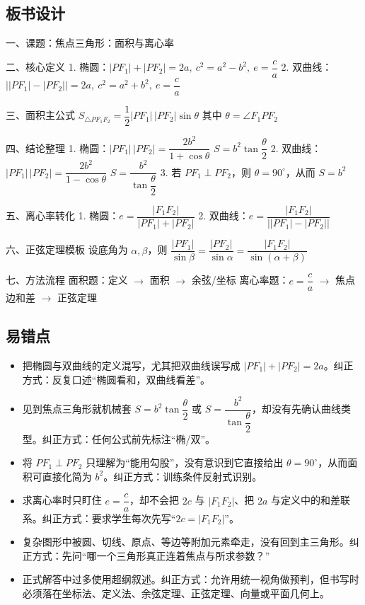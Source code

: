 \documentclass[UTF8,a4paper,11pt]{ctexart}
\begin{document}
\subsection*{板书设计}

一、课题：焦点三角形：面积与离心率

二、核心定义
1. 椭圆：$|PF_1|+|PF_2|=2a,\ c^2=a^2-b^2,\ e=\dfrac ca$
2. 双曲线：$\bigl||PF_1|-|PF_2|\bigr|=2a,\ c^2=a^2+b^2,\ e=\dfrac ca$

三、面积主公式
$S_{\triangle PF_1F_2}=\dfrac12|PF_1|\,|PF_2|\sin\theta$
其中 $\theta=\angle F_1PF_2$

四、结论整理
1. 椭圆：$|PF_1|\,|PF_2|=\dfrac{2b^2}{1+\cos\theta}$
   $S=b^2\tan\dfrac\theta2$
2. 双曲线：$|PF_1|\,|PF_2|=\dfrac{2b^2}{1-\cos\theta}$
   $S=\dfrac{b^2}{\tan\dfrac\theta2}$
3. 若 $PF_1\perp PF_2$，则 $\theta=90^\circ$，从而 $S=b^2$

五、离心率转化
1. 椭圆：$e=\dfrac{|F_1F_2|}{|PF_1|+|PF_2|}$
2. 双曲线：$e=\dfrac{|F_1F_2|}{\bigl||PF_1|-|PF_2|\bigr|}$

六、正弦定理模板
设底角为 $\alpha,\beta$，则
$\dfrac{|PF_1|}{\sin\beta}=\dfrac{|PF_2|}{\sin\alpha}=\dfrac{|F_1F_2|}{\sin(\alpha+\beta)}$

七、方法流程
面积题：定义 $\to$ 面积 $\to$ 余弦/坐标
离心率题：$e=\dfrac ca$ $\to$ 焦点边和差 $\to$ 正弦定理

\subsection*{易错点}

\begin{itemize}

\item 把椭圆与双曲线的定义混写，尤其把双曲线误写成 $|PF_1|+|PF_2|=2a$。纠正方式：反复口述“椭圆看和，双曲线看差”。

\item 见到焦点三角形就机械套 $S=b^2\tan\dfrac\theta2$ 或 $S=\dfrac{b^2}{\tan\dfrac\theta2}$，却没有先确认曲线类型。纠正方式：任何公式前先标注“椭/双”。

\item 将 $PF_1\perp PF_2$ 只理解为“能用勾股”，没有意识到它直接给出 $\theta=90^\circ$，从而面积可直接化简为 $b^2$。纠正方式：训练条件反射式识别。

\item 求离心率时只盯住 $e=\dfrac ca$，却不会把 $2c$ 与 $|F_1F_2|$、把 $2a$ 与定义中的和差联系。纠正方式：要求学生每次先写“$2c=|F_1F_2|$”。

\item 复杂图形中被圆、切线、原点、等边等附加元素牵走，没有回到主三角形。纠正方式：先问“哪一个三角形真正连着焦点与所求参数？”

\item 正式解答中过多使用超纲叙述。纠正方式：允许用统一视角做预判，但书写时必须落在坐标法、定义法、余弦定理、正弦定理、向量或平面几何上。

\end{itemize}
\end{document}
